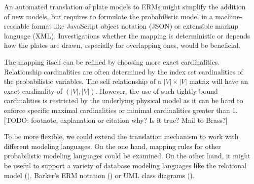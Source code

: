 An automated translation of plate models to ERMs might simplify the addition of new models, but requires to formulate the probabilistic model in a machine-readable format like JavaScript object notation (JSON) or extensible markup language (XML). Investigations whether the mapping is deterministic or depends how the plates are drawn, especially for overlapping ones, would be beneficial.

The mapping itself can be refined by choosing more exact cardinalities. Relationship cardinalities are often determined by the index set cardinalities of the probabilistic variables. The self relationship of a $|V| \times |V|$ matrix will have an exact cardinality of $(|V|, |V|)$. However, the use of such tightly bound cardinalities is restricted by the underlying physical model as it can be hard to enforce specific maximal cardinalities or minimal cardinalities greater than 1. [TODO: footnote, explanation or citation why? Is it true? Mail to Brass?]

To be more flexible, we could extend the translation mechanism to work with different modeling languages. On the one hand, mapping rules for other probabilistic modeling languages could be examined. On the other hand, it might be useful to support a variety of database modeling languages like the relational model (\cite{codd1970relational}), Barker's ERM notation (\cite{barker1990case}) or UML class diagrams (\cite{rumbaugh2004unified}).
